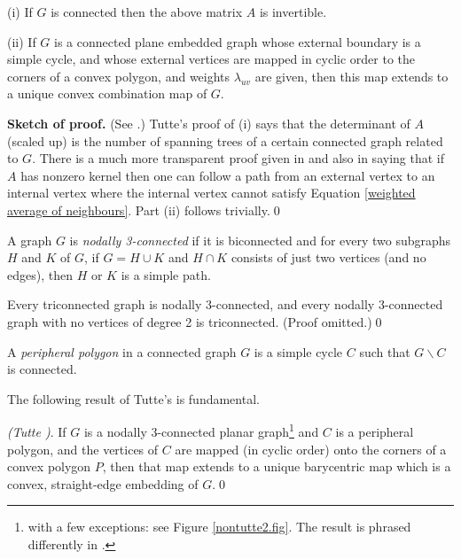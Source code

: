 \begin{lemma}
\label{unique convex combination map} {\rm (i)} If $G$ is connected then the above matrix $A$ is
invertible.

{\rm (ii)} If $G$ is a connected plane embedded graph whose external
boundary is a simple cycle, and whose external
vertices are mapped in cyclic order to the corners of
a convex polygon, and weights $\lambda_{uv}$ are given,
then this map extends to a unique
convex combination map of $G$.
\end{lemma}

{\bf Sketch of proof.}
(See \cite{tutte,bsst,floater97,white}.)
Tutte's proof of (i) \cite{tutte,bsst} says that
the determinant of $A$ (scaled up) is the number of spanning trees of
a certain connected graph related to $G$.
There is a much more transparent proof given
in \cite{floater97} and also in \cite{white} saying
that if $A$ has nonzero kernel then one can follow
a path from an external vertex to an internal vertex
where the internal vertex cannot satisfy Equation
\ref{weighted average of neighbours}.
Part (ii) follows trivially.\qed





\begin{definition}
\label{nodal 3-connectivity} A graph $G$ is {\em nodally 3-connected} if it
is biconnected and for every two subgraphs
$H$ and $K$ of $G$, if $G = H\cup K$ and
$H\cap K$ consists of just two vertices (and
no edges), then $H$ or $K$ is a simple path.
\end{definition}

\begin{proposition}
\label{nodally 3-connected and no deg 2} Every triconnected graph is nodally 3-connected,
and every nodally 3-connected graph with no vertices
of degree 2 is triconnected. (Proof omitted.)\qed
\end{proposition}

\begin{definition}
\label{peripheral polygon} A {\em peripheral polygon} in a connected graph $G$
is a simple cycle $C$ such that $G\backslash C$ is
connected.
\end{definition}

The following result of Tutte's is fundamental.

\begin{proposition}
\label{tutte's theorem} {\em (Tutte \cite{tutte})}. If $G$ is a nodally 3-connected
planar graph\footnote{with a few
exceptions: see Figure \ref{nontutte2.fig}. The result is phrased
differently in \cite{tutte}.}  and $C$ is a peripheral polygon, and
the vertices of $C$ are mapped (in cyclic order) onto the corners of a convex
polygon $P$, then that map extends to a unique barycentric map
which is a convex, straight-edge embedding of $G$.\qed
\end{proposition}

